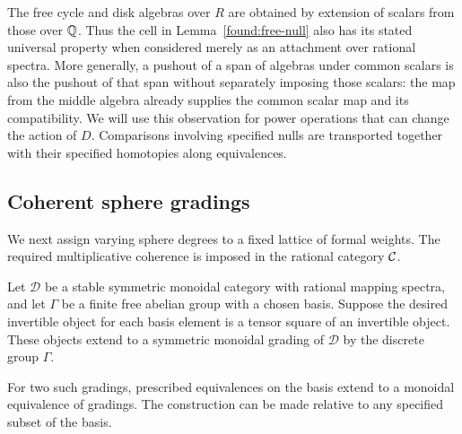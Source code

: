 \begin{remark}\label{found:scalar-pushouts}
The free cycle and disk algebras over $R$ are obtained by extension
of scalars from those over $\mathbb Q$.  Thus the cell in
Lemma~\ref{found:free-null} also has its stated universal property
when considered merely as an attachment over rational spectra.
More generally, a pushout of a span of algebras under common scalars
is also the pushout of that span without separately imposing those
scalars: the map from the middle algebra already supplies the common
scalar map and its compatibility.  We will use this observation for
power operations that can change the action of $D$.  Comparisons
involving specified nulls are transported together with their
specified homotopies along equivalences.
\end{remark}

\subsection{Coherent sphere gradings}

We next assign varying sphere degrees to a fixed lattice of formal
weights.  The required multiplicative coherence is imposed in the
rational category $\mathcal C$.

\begin{lemma}\label{found:picard-grading}
Let $\mathcal D$ be a stable symmetric monoidal category with rational
mapping spectra, and let $\Gamma$ be a finite free abelian group with
a chosen basis.  Suppose the desired invertible object for each basis
element is a tensor square of an invertible object.  These objects
extend to a symmetric monoidal grading of $\mathcal D$ by the
discrete group $\Gamma$.

For two such gradings, prescribed equivalences on the basis extend
to a monoidal equivalence of gradings.  The construction can be made
relative to any specified subset of the basis.
\end{lemma}

